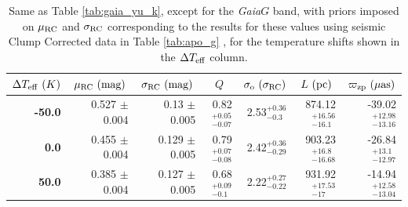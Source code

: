 \documentclass[fleqn,usenatbib]{mnras}
\newcommand{\murc}{\mbox{$\mu_{\rm RC}$}\xspace}
\newcommand{\sigrc}{\mbox{$\sigma_{\rm RC}$}\xspace}
\newcommand{\teff}{\mbox{$T_{\rm eff}$}\xspace}
\newcommand{\gaia}{\emph{Gaia}\xspace}
\begin{document}
\begin{table}
    \begin{tabular}{rrrrrrr}
    \toprule
    \multicolumn{1}{c}{$\Delta T_{\rm eff}\ (K)$} & \multicolumn{1}{c}{$\mu_{\rm RC}\ (\rm mag)$} & \multicolumn{1}{c}{$\sigma_{\rm RC}\ (\rm mag)$}  & \multicolumn{1}{c}{$Q$} &  \multicolumn{1}{c}{$\sigma_{\rm o}\ (\sigma_{\rm RC})$} & \multicolumn{1}{c}{$L\ (\rm pc)$} & \multicolumn{1}{c}{$\varpi_{\rm zp}\ (\mu \rm as)$} \\
    \midrule
        \textbf{-50.0} &  0.527 $\pm$ 0.004 &   0.13 $\pm$ 0.005 &  0.82$_{-0.07}^{+0.05}$ &  2.53$_{- 0.3}^{+0.36}$ &  874.12$_{- 16.1}^{+16.56}$  & -39.02$_{-13.16}^{+12.98}$\\
        \textbf{0.0  } &  0.455 $\pm$ 0.004 &  0.129 $\pm$ 0.005 &  0.79$_{-0.08}^{+0.07}$ &  2.42$_{-0.29}^{+0.36}$ &  903.23$_{-16.68}^{+ 16.8}$  & -26.84$_{-12.97}^{+ 13.1}$ \\
        \textbf{50.0 } &  0.385 $\pm$ 0.004 &  0.127 $\pm$ 0.005 &  0.68$_{- 0.1}^{+0.09}$ &  2.22$_{-0.22}^{+0.27}$ &  931.92$_{- 17  }^{+17.53}$  & -14.94$_{-13.04}^{+12.58}$\\
    \bottomrule
    \end{tabular}
\caption{Same as Table \ref{tab:gaia_yu_k}, except for the \gaia $G$ band, with priors imposed on \murc and \sigrc corresponding to the results for these values using seismic Clump Corrected data in Table \ref{tab:apo_g} , for the temperature shifts shown in the $\Delta\teff$ column.} 
\label{tab:gaia_apo_g}
\end{table}
\end{document}
